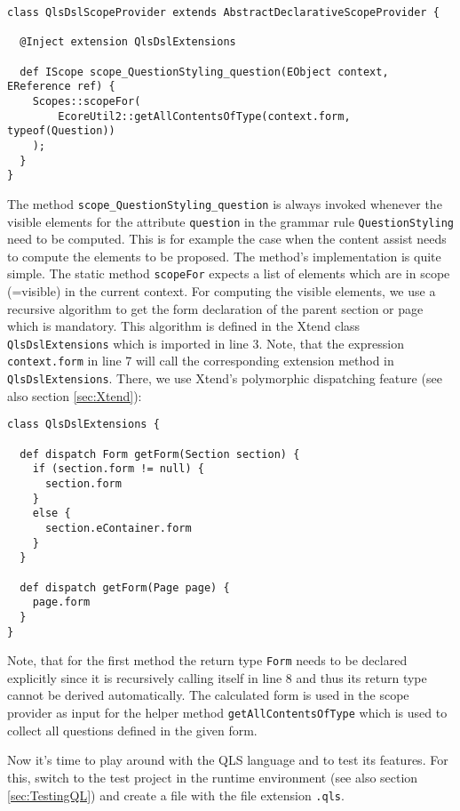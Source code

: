 \begin{lstlisting}[language=Xtend]
class QlsDslScopeProvider extends AbstractDeclarativeScopeProvider {
	
  @Inject extension QlsDslExtensions
	
  def IScope scope_QuestionStyling_question(EObject context, EReference ref) {
    Scopes::scopeFor(
    	EcoreUtil2::getAllContentsOfType(context.form, typeof(Question))
    );
  }
}
\end{lstlisting}

The method \texttt{scope\_QuestionStyling\_question} is always invoked whenever
the visible elements for the attribute \texttt{question} in the grammar rule
\texttt{QuestionStyling} need to be computed. This is for example the case when
the content assist needs to compute the elements to be proposed. The method's
implementation is quite simple. The static method \texttt{scopeFor} expects a
list of elements which are in scope (=visible) in the current context. For
computing the visible elements, we use a recursive algorithm to get the form
declaration of the parent section or page which is mandatory. This algorithm is
defined in the Xtend class \texttt{QlsDslExtensions} which is imported in line
3. Note, that the expression \texttt{context.form} in line 7 will call the
corresponding extension method in \texttt{QlsDslExtensions}. There, we use
Xtend's polymorphic dispatching feature (see also section \ref{sec:Xtend}):

\begin{lstlisting}[language=Xtend]
class QlsDslExtensions {
	
  def dispatch Form getForm(Section section) {
    if (section.form != null) {
      section.form
    }
    else {
      section.eContainer.form
    }
  }
	
  def dispatch getForm(Page page) {
    page.form
  }
}
\end{lstlisting}

Note, that for the first method the return type \texttt{Form} needs to be
declared explicitly since it is recursively calling itself in line 8 and thus
its return type cannot be derived automatically. The calculated form is used in
the scope provider as input for the helper method \texttt{getAllContentsOfType}
which is used to collect all questions defined in the given form.

Now it's time to play around with the QLS language and to test its features. For this,
switch to the test project in the runtime environment (see also section \ref{sec:TestingQL})
and create a file with the file extension \texttt{.qls}.